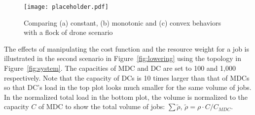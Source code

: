 
\begin{figure}[tb]
  \begin{center}
    \texttt{[image: placeholder.pdf]}
    \vspace{-4.0ex}
    \caption{Comparing (a) constant, (b) monotonic and (c) convex behaviors with
      a flock of drone scenario}
    \smallskip
    \raggedright
    \small
    \label{fig:edge}
  \end{center}
\end{figure}

The effects of manipulating the cost function and the resource weight
for a job is illustrated in the second scenario in
Figure~\ref{fig:lowering} using the topology in Figure~\ref{fig:system}.
The capacities of MDC and DC are set to 100 and 1,000 respectively.
Note that the capacity of DCs is 10 times larger than that of MDCs
so that DC's load in the top plot looks much smaller for the same
volume of jobs.
In the normalized total load in the bottom plot, the volume is normalized
to the capacity $C$ of MDC to show the total volume of jobs:
$\sum \tilde{\rho}$, \:$\tilde{\rho} = \rho \cdot C/C_{MDC}$.

